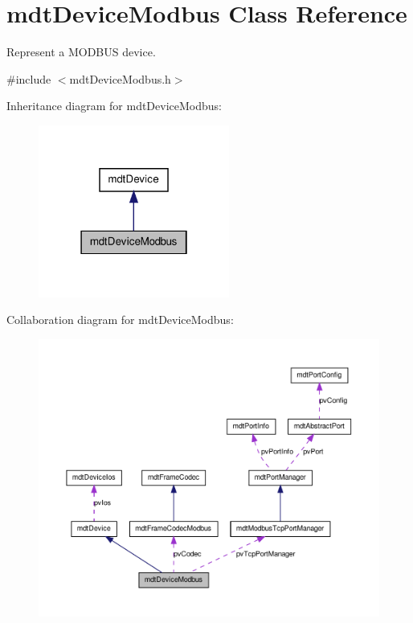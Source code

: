 \hypertarget{classmdt_device_modbus}{
\section{mdtDeviceModbus Class Reference}
\label{classmdt_device_modbus}
}


Represent a MODBUS device.  




{\ttfamily \#include $<$mdtDeviceModbus.h$>$}



Inheritance diagram for mdtDeviceModbus:\nopagebreak
\begin{figure}[H]
\begin{center}
\leavevmode
\includegraphics[width=178pt]{classmdt_device_modbus__inherit__graph}
\end{center}
\end{figure}


Collaboration diagram for mdtDeviceModbus:\nopagebreak
\begin{figure}[H]
\begin{center}
\leavevmode
\includegraphics[width=400pt]{classmdt_device_modbus__coll__graph}
\end{center}
\end{figure}
